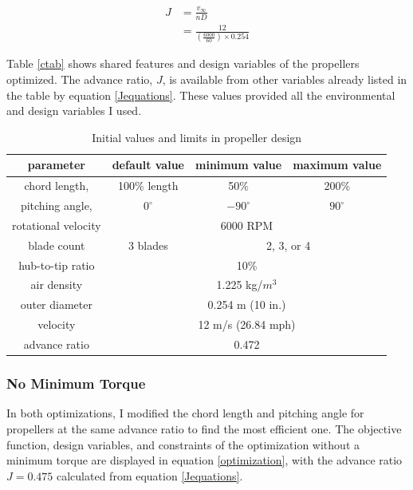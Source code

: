 \documentclass[journal ]{new-aiaa}
\newcounter{ctab}
\begin{document}
\begin{equation}
	\begin{aligned} 
	J & = \frac{v_{\infty}}{n D} \\
	& = \frac{12}{(\frac{6000}{60}) \times 0.254}
	\end{aligned}
	\label{Jequations}
\end{equation}

Table \eqref{ctab} shows shared features and design variables of the propellers optimized. The advance ratio, $J$, is available from other variables already listed in the table by equation \eqref{Jequations}. These values provided all the environmental and design variables I used.

\begin{table}[H]
 \centering
 \begin{tabular}{| c | c | c | c |} \hline
 	 \textbf{parameter} & \textbf{default value} & \textbf{minimum value} & \textbf{maximum value} \\ \hline
	 chord length, & 100\% length & 50\% & 200\% \\ \hline
	 pitching angle, & $0^{\circ}$ & $-90^{\circ}$ & $90^{\circ}$ \\ \hline \hline
	 rotational velocity & \multicolumn{3}{c|}{6000 RPM} \\ \hline
	 blade count & 3 blades & \multicolumn{2}{c|}{2, 3, or 4}\\ \hline
	 hub-to-tip ratio & \multicolumn{3}{c|}{10\%} \\ \hline
	 air density & \multicolumn{3}{c|}{1.225 kg/$m^{3}$} \\ \hline
	 outer diameter & \multicolumn{3}{c|}{0.254 m (10 in.)} \\ \hline
	 velocity & \multicolumn{3}{c|}{12 m/s (26.84 mph)} \\ \hline
	 advance ratio & \multicolumn{3}{c|}{0.472} \\ \hline
 \end{tabular}
 \caption{Initial values and limits in propeller design}
 \label{ctab}
\end{table}

\subsubsection{No Minimum Torque}

In both optimizations, I modified the chord length and pitching angle for propellers at the same advance ratio to find the most efficient one. The objective function, design variables, and constraints of the optimization without a minimum torque are displayed in equation \eqref{optimization}, with the advance ratio $J=0.475$ calculated from equation \eqref{Jequations}. 
\end{document}
